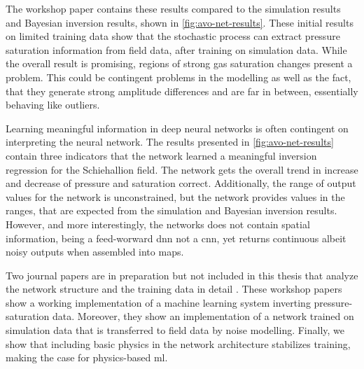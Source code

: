 
The workshop paper \citet{dramsch2019deep} contains these results compared to the simulation results and Bayesian inversion results, shown in \cref{fig:avo-net-results}. These initial results on limited training data show that the stochastic process can extract pressure saturation information from field data, after training on simulation data. While the overall result is promising, regions of strong gas saturation changes present a problem. This could be contingent problems in the modelling as well as the fact, that they generate strong amplitude differences and are far in between, essentially behaving like outliers. 

Learning meaningful information in deep neural networks is often contingent on interpreting the neural network. The results presented in \cref{fig:avo-net-results} contain three indicators that the network learned a meaningful inversion regression for the Schiehallion field. The network gets the overall trend in increase and decrease of pressure and saturation correct. Additionally, the range of output values for the network is unconstrained, but the network provides values in the ranges, that are expected from the simulation and Bayesian inversion results.  However, and more interestingly, the networks does not contain spatial information, being a feed-worward \ac{dnn} not a \ac{cnn}, yet returns continuous albeit noisy outputs when assembled into maps.

Two journal papers are in preparation but not included in this thesis that analyze the network structure and the training data in detail \citep{corte2019exploring}. These workshop papers show a working implementation of a machine learning system inverting pressure-saturation data. Moreover, they show an implementation of a network trained on simulation data that is transferred to field data by noise modelling. Finally, we show that including basic physics in the network architecture stabilizes training, making the case for physics-based \acl{ml}.



